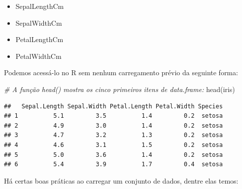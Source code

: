 \documentclass[
]{book}
\newenvironment{Shaded}{\begin{snugshade}}{\end{snugshade}}
\newcommand{\CommentTok}[1]{\textcolor[rgb]{0.56,0.35,0.01}{\textit{#1}}}
\newcommand{\FunctionTok}[1]{\textcolor[rgb]{0.00,0.00,0.00}{#1}}
\newcommand{\NormalTok}[1]{#1}
\begin{document}
\begin{itemize}
\item
  SepalLengthCm
\item
  SepalWidthCm
\item
  PetalLengthCm
\item
  PetalWidthCm
\end{itemize}

Podemos acessá-lo no R sem nenhum carregamento prévio da seguinte forma:

\begin{Shaded}
\begin{Highlighting}[]
\CommentTok{\# A função head() mostra os cinco primeiros itens de data.frame:}
\FunctionTok{head}\NormalTok{(iris)}
\end{Highlighting}
\end{Shaded}

\begin{verbatim}
##   Sepal.Length Sepal.Width Petal.Length Petal.Width Species
## 1          5.1         3.5          1.4         0.2  setosa
## 2          4.9         3.0          1.4         0.2  setosa
## 3          4.7         3.2          1.3         0.2  setosa
## 4          4.6         3.1          1.5         0.2  setosa
## 5          5.0         3.6          1.4         0.2  setosa
## 6          5.4         3.9          1.7         0.4  setosa
\end{verbatim}

Há certas boas práticas ao carregar um conjunto de dados, dentre elas temos:
\end{document}
